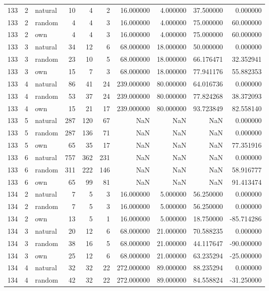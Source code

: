 \begin{table}[htbp]
\begin{tabular}{rrlrrrrrrr}
133 & 2 & natural & 10 & 4 & 2 & 16.000000 & 4.000000 & 37.500000 & 0.000000 \\
133 & 2 & random & 4 & 4 & 3 & 16.000000 & 4.000000 & 75.000000 & 60.000000 \\
133 & 2 & own & 4 & 4 & 3 & 16.000000 & 4.000000 & 75.000000 & 60.000000 \\
133 & 3 & natural & 34 & 12 & 6 & 68.000000 & 18.000000 & 50.000000 & 0.000000 \\
133 & 3 & random & 23 & 10 & 5 & 68.000000 & 18.000000 & 66.176471 & 32.352941 \\
133 & 3 & own & 15 & 7 & 3 & 68.000000 & 18.000000 & 77.941176 & 55.882353 \\
133 & 4 & natural & 86 & 41 & 24 & 239.000000 & 80.000000 & 64.016736 & 0.000000 \\
133 & 4 & random & 53 & 37 & 24 & 239.000000 & 80.000000 & 77.824268 & 38.372093 \\
133 & 4 & own & 15 & 21 & 17 & 239.000000 & 80.000000 & 93.723849 & 82.558140 \\
133 & 5 & natural & 287 & 120 & 67 & NaN & NaN & NaN & 0.000000 \\
133 & 5 & random & 287 & 136 & 71 & NaN & NaN & NaN & 0.000000 \\
133 & 5 & own & 65 & 35 & 17 & NaN & NaN & NaN & 77.351916 \\
133 & 6 & natural & 757 & 362 & 231 & NaN & NaN & NaN & 0.000000 \\
133 & 6 & random & 311 & 222 & 146 & NaN & NaN & NaN & 58.916777 \\
133 & 6 & own & 65 & 99 & 81 & NaN & NaN & NaN & 91.413474 \\
134 & 2 & natural & 7 & 5 & 3 & 16.000000 & 5.000000 & 56.250000 & 0.000000 \\
134 & 2 & random & 7 & 5 & 3 & 16.000000 & 5.000000 & 56.250000 & 0.000000 \\
134 & 2 & own & 13 & 5 & 1 & 16.000000 & 5.000000 & 18.750000 & -85.714286 \\
134 & 3 & natural & 20 & 12 & 6 & 68.000000 & 21.000000 & 70.588235 & 0.000000 \\
134 & 3 & random & 38 & 16 & 5 & 68.000000 & 21.000000 & 44.117647 & -90.000000 \\
134 & 3 & own & 25 & 12 & 6 & 68.000000 & 21.000000 & 63.235294 & -25.000000 \\
134 & 4 & natural & 32 & 32 & 22 & 272.000000 & 89.000000 & 88.235294 & 0.000000 \\
134 & 4 & random & 42 & 32 & 22 & 272.000000 & 89.000000 & 84.558824 & -31.250000 \\

\end{tabular}
\end{table}

